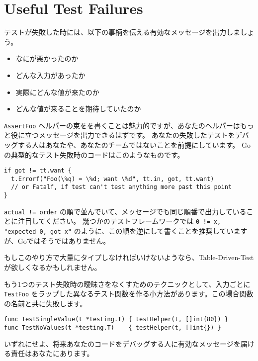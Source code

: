\section{Useful Test Failures}

テストが失敗した時には、以下の事柄を伝える有効なメッセージを出力しましょう。

\begin{itemize}
  \item なにが悪かったのか
  \item どんな入力があったか
  \item 実際にどんな値が来たのか
  \item どんな値が来ることを期待していたのか
\end{itemize}

\texttt{AssertFoo} ヘルパーの束をを書くことは魅力的ですが、あなたのヘルパーはもっと役に立つメッセージを出力できるはずです。 あなたの失敗したテストをデバッグする人はあなたや、あなたのチームではないことを前提にしています。 Goの典型的なテスト失敗時のコードはこのようなものです。

\begin{lstlisting}[]
if got != tt.want {
  t.Errorf("Foo(\%q) = \%d; want \%d", tt.in, got, tt.want)
  // or Fatalf, if test can't test anything more past this point
}
\end{lstlisting}

\texttt{actual != order} の順で並んでいて、メッセージでも同じ順番で出力していることに注目してください。 幾つかのテストフレームワークでは \texttt{0 != x, "expected 0, got x"} のように、この順を逆にして書くことを推奨していますが、Goではそうではありません。

もしこのやり方で大量にタイプしなければいけないようなら、Table-Driven-Testが欲しくなるかもしれません。

もう1つのテスト失敗時の曖昧さをなくすためのテクニックとして、入力ごとに \texttt{TestFoo} をラップした異なるテスト関数を作る小方法があります。この場合関数の名前と共に失敗します。

\begin{lstlisting}[]
func TestSingleValue(t *testing.T) { testHelper(t, []int{80}) }
func TestNoValues(t *testing.T)    { testHelper(t, []int{}) }
\end{lstlisting}

いずれにせよ、将来あなたのコードをデバッグする人に有効なメッセージを届ける責任はあなたにあります。
